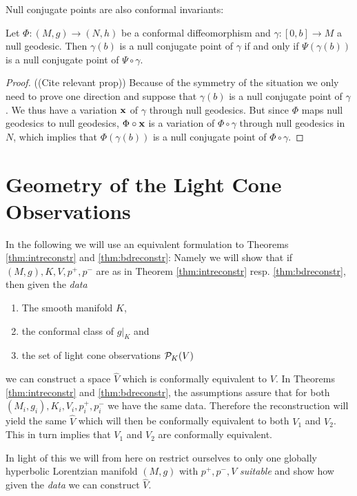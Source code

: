 Null conjugate points are also conformal invariants:
\begin{proposition}
    Let $\Phi:(M,g)\to (N,h)$ be a conformal diffeomorphism and $\gamma:[0,b]\to M$ a null geodesic. Then $\gamma(b)$ is a null conjugate point of $\gamma$ if and only if $\Psi(\gamma(b))$ is a null conjugate point of $\Psi \circ \gamma$.
\end{proposition}
\begin{proof}
    ((Cite relevant prop))
    Because of the symmetry of the situation we only need to prove one direction and suppose that $\gamma(b)$ is a null conjugate point of $\gamma$. We thus have a variation $\mathbf{x}$ of $\gamma$ through null geodesics. But since $\Phi$ maps null geodesics to null geodesics, $\Phi\circ \mathbf{x}$ is a variation of $\Phi \circ \gamma$ through null geodesics in $N$, which implies that $\Phi(\gamma(b))$ is a null conjugate point of $\Phi \circ \gamma$.
\end{proof}

\section{Geometry of the Light Cone Observations}

\begin{remark}[Data]\label{rmk:data} 
    In the following we will use an equivalent formulation to Theorems \ref{thm:intreconstr} and \ref{thm:bdreconstr}: Namely we will show that if $(M,g), K, V, p^+,p^-$ are as in Theorem \ref{thm:intreconstr} resp. \ref{thm:bdreconstr}, then given the \emph{data}
    \begin{enumerate}[label={\textnormal{(\arabic*)}}]
        \item The smooth manifold $K$,
        \item the conformal class of $g\rvert_K$ and
        \item the set of light cone observations ${\mathcal{P}}_K(V)$
    \end{enumerate}
    we can construct a space $\widehat{V}$ which is conformally equivalent to $V$.
    In Theorems \ref{thm:intreconstr} and \ref{thm:bdreconstr}, the assumptions assure that for both $(M_i,g_i), K_i, V_i, p^+_i,p^-_i$ we have the same data. Therefore the reconstruction will yield the same $\widehat{V}$ which will then be conformally equivalent to both $V_1$ and $V_2$. This in turn implies that $V_1$ and $V_2$ are conformally equivalent.

    In light of this we will from here on restrict ourselves to only one globally hyperbolic Lorentzian manifold $(M,g)$ with $p^+,p^-, V$ \emph{suitable} and show how given the \emph{data} we can construct $\widehat{V}$.
\end{remark}

